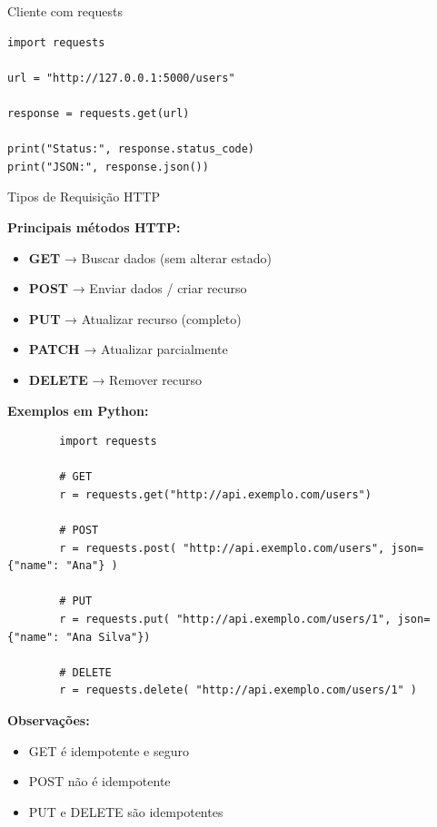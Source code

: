 \documentclass{beamer}
\begin{document}
\begin{frame}[fragile]{Cliente com requests}

\begin{verbatim}
import requests

url = "http://127.0.0.1:5000/users"

response = requests.get(url)

print("Status:", response.status_code)
print("JSON:", response.json())
\end{verbatim}

\end{frame}

\begin{frame}[fragile]{Tipos de Requisição HTTP}
	
	\textbf{Principais métodos HTTP:}
	
	\begin{itemize}
		\item \textbf{GET} → Buscar dados (sem alterar estado)
		\item \textbf{POST} → Enviar dados / criar recurso
		\item \textbf{PUT} → Atualizar recurso (completo)
		\item \textbf{PATCH} → Atualizar parcialmente
		\item \textbf{DELETE} → Remover recurso
	\end{itemize}
	
	\textbf{Exemplos em Python:}
	
	\begin{verbatim}
		import requests
		
		# GET
		r = requests.get("http://api.exemplo.com/users")
		
		# POST
		r = requests.post( "http://api.exemplo.com/users", json={"name": "Ana"} )
		
		# PUT
		r = requests.put( "http://api.exemplo.com/users/1", json={"name": "Ana Silva"})
		
		# DELETE
		r = requests.delete( "http://api.exemplo.com/users/1" )
	\end{verbatim}
	
	\vspace{0.3cm}
	
	\textbf{Observações:}
	\begin{itemize}
		\item GET é idempotente e seguro
		\item POST não é idempotente
		\item PUT e DELETE são idempotentes
	\end{itemize}
	
\end{frame}
\end{document}
